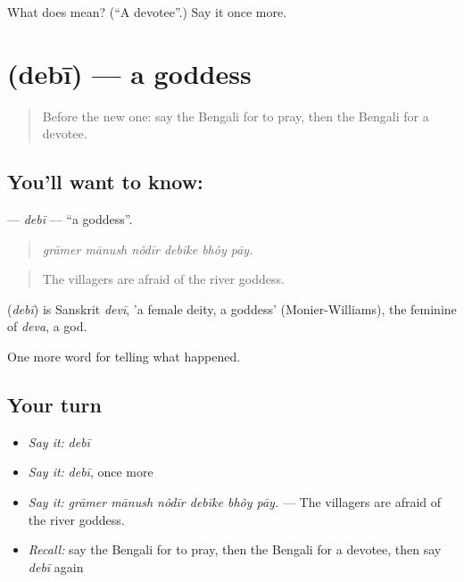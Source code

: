 \begin{tcolorbox}[breakable,colback=teal!4,colframe=teal!35!black,title={Before you move on}]
What does  mean? (\textquotedblleft{}A devotee\textquotedblright{}.) Say it once more.
\end{tcolorbox}
\section[\texorpdfstring{\bn{দেবী} (debī)}{দেবী (debī)}]{ (debī) — a goddess}

\label{lesson:BN-C310-debi}



\begin{quote}
Before the new one: say the Bengali for to pray, then the Bengali for a devotee.
\end{quote}

\subsection*{You'll want to know: }
\textbf{} — \emph{debī} — \textquotedblleft{}a goddess\textquotedblright{}.

\begin{quote}
     
\end{quote}

\begin{quote}
\emph{grāmer mānush nôdīr debīke bhôy pāy.}
\end{quote}

\begin{quote}
The villagers are afraid of the river goddess.
\end{quote}

\begin{cousinweb}
\textbf{} (\emph{debī}) is Sanskrit \emph{devī}, 'a female deity, a goddess' (Monier-Williams), the feminine of \emph{deva}, a god.
\end{cousinweb}

\begin{grammarlens}[title={What you've built}]
One more word for telling what happened.
\end{grammarlens}

\subsection*{Your turn}
\begin{itemize}
\raggedright
  \item \emph{Say it:} \emph{debī}
  \item \emph{Say it:} \emph{debī}, once more
  \item \emph{Say it:} \emph{grāmer mānush nôdīr debīke bhôy pāy.} — The villagers are afraid of the river goddess.
  \item \emph{Recall:} say the Bengali for to pray, then the Bengali for a devotee, then say \emph{debī} again
\end{itemize}


